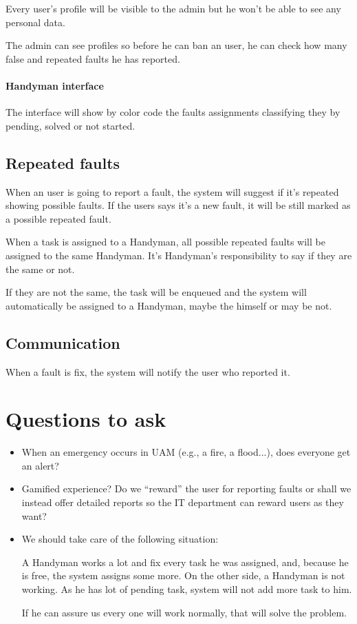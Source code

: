 \documentclass{article}
\newcommand{\tbg}{Handyman\xspace}
\begin{document}
Every user's profile will be visible to the admin but he won't be able to see any personal data.

The admin can see profiles so before he can ban an user, he can check how many false and repeated faults he has reported.


\paragraph{\tbg interface}
The interface will show by color code the faults assignments classifying  they by pending, solved or not started.


\subsection{Repeated faults}
When an user is going to report a fault, the system will suggest if it's repeated showing possible faults. If the users says it's a new fault, it will be still marked as a possible repeated fault.

When a task is assigned to a \tbg, all possible repeated faults will be assigned to the same \tbg. It's \tbg's responsibility to say if they are the same or not.

If they are not the same, the task will be enqueued and the system will automatically be assigned to a \tbg, maybe the himself or may be not.


\subsection{Communication}

When a fault is fix, the system will notify the user who reported it.

\section{Questions to ask}

\begin{itemize}
\item When an emergency occurs in UAM (e.g., a fire, a flood...), does everyone get an alert?
\item Gamified experience? Do we ``reward'' the user for reporting faults or shall we instead offer detailed reports so the IT department can reward users as they want?
\item We should take care of the following situation:

A \tbg works a lot and fix every task he was assigned, and, because he is free, the system assigns some more. On the other side, a \tbg is not working. As he has lot of pending task, system will not add more task to him. 

If he can assure us every one will work normally, that will solve the problem.
\end{itemize}
\end{document}
